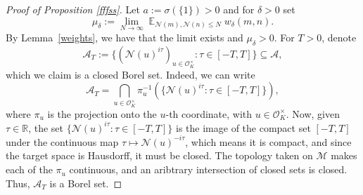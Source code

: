 \documentclass[11pt]{amsart}
\theoremstyle{definition}
\DeclareMathOperator*{\E}{\mathbb{E}}
\newcommand{\NN}{{\mathcal N}}
\newcommand{\R}{{\mathbb R}}
\begin{document}
\begin{proof}[Proof of Proposition \ref{fffss}]



Let $a:=\sigma(\{1\})>0$ and for $\delta>0$ set
    $$\mu_{\delta}:=\lim_{N\to\infty}\E_{\NN(m), \NN(n) \leq N}w_{\delta}(m,n).$$
By Lemma~\ref{weights}, we have that the limit exists and $\mu_{\delta}>0$. For $T>0$, denote
$$\mathcal{A}_{T}:=\{(\NN(u)^{i\tau})_{u\in\mathcal O_K^{\times}}\colon \tau\in [-T,T]\}\subseteq \mathcal{A},$$
which we claim is a closed Borel set. Indeed, we can write
\[
\mathcal{A}_T= \bigcap_{u \in \mathcal O_K^{\times}} \pi_u^{-1}\left(\{ \NN(u)^{i\tau} : \tau \in [-T,T] \}\right),
\]
where $\pi_u$ is the projection onto the $u$-th coordinate, with $u \in \mathcal O_K^{\times}$. Now, given $\tau \in \R$, the set $\{\NN(u)^{i\tau} : \tau \in [-T,T] \}$ is the image of the compact set $[-T,T]$ under the continuous map $\tau \mapsto\NN(u)^{-i\tau}$, which means it is compact, and since the target space is Hausdorff, it must be closed. The topology taken on $\mathcal{M}$ makes each of the $\pi_u$ continuous, and an aribtrary intersection of closed sets is closed. Thus, $\mathcal{A}_T$ is a Borel set.


\end{proof}
\end{document}
